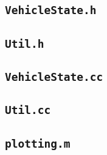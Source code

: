 \documentclass[11pt]{article}
\begin{document}
\subsection{\texttt{VehicleState.h}}


\subsection{\texttt{Util.h}}


\subsection{\texttt{VehicleState.cc}}


\subsection{\texttt{Util.cc}}



\subsection{\texttt{plotting.m}}

\end{document}
